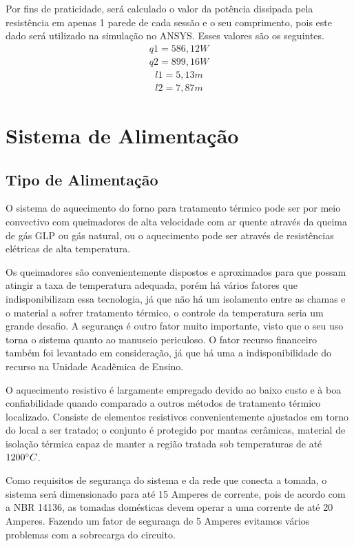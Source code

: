 Por fins de praticidade, será calculado o valor da potência dissipada pela resistência em apenas 1 parede de cada sessão e o seu comprimento, pois este dado será utilizado na simulação no ANSYS\@. Esses valores são os seguintes.
\begin{gather}
    q1 = 586,12W \nonumber \\
    q2 = 899,16W \nonumber
\end{gather}
\begin{gather}
    l1 = 5,13m \nonumber \\
    l2 = 7,87m \nonumber
\end{gather}

\section{Sistema de Alimentação}
\subsection{Tipo de Alimentação}
O sistema de aquecimento do forno para tratamento térmico pode ser por meio convectivo com queimadores de alta velocidade com ar quente através da queima de gás GLP ou gás natural, ou o aquecimento pode ser através de resistências elétricas de alta temperatura.

Os queimadores são convenientemente dispostos e aproximados para que possam atingir a taxa de temperatura adequada, porém há vários fatores que indisponibilizam essa tecnologia, já que não há um isolamento entre as chamas e o material a sofrer tratamento térmico, o controle da temperatura seria um grande desafio. A segurança é outro fator muito importante, visto que o seu uso torna o sistema quanto ao manuseio periculoso. O fator recurso financeiro também foi levantado em consideração, já que há uma a indisponibilidade do recurso na Unidade Acadêmica de Ensino.

O aquecimento resistivo é largamente empregado devido ao baixo custo e à boa confiabilidade quando comparado a outros métodos de tratamento térmico localizado. Consiste de elementos resistivos convenientemente ajustados em torno do local a ser tratado; o conjunto é protegido por mantas cerâmicas, material de isolação térmica capaz de manter a região tratada sob temperaturas de até $1200\degree C$.

Como requisitos de segurança do sistema e da rede que conecta a tomada, o sistema será dimensionado para até 15 Amperes de corrente, pois de acordo com a NBR 14136, as tomadas domésticas devem operar a uma corrente de até 20 Amperes. Fazendo um fator de segurança de 5 Amperes evitamos vários problemas com a sobrecarga do circuito.

